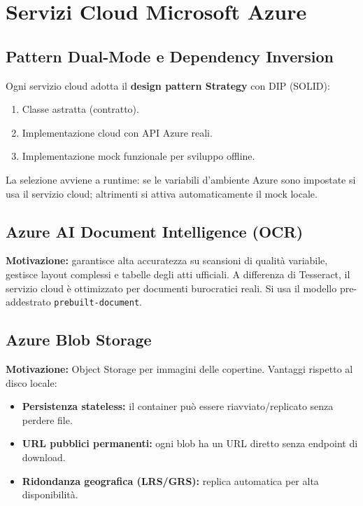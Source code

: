 \documentclass[12pt,a4paper,oneside]{report}
\begin{document}
\chapter{Servizi Cloud Microsoft Azure}

\section{Pattern Dual-Mode e Dependency Inversion}

Ogni servizio cloud adotta il \textbf{design pattern Strategy} con DIP (SOLID):
\begin{enumerate}
    \item Classe astratta (contratto).
    \item Implementazione cloud con API Azure reali.
    \item Implementazione mock funzionale per sviluppo offline.
\end{enumerate}
La selezione avviene a runtime: se le variabili d'ambiente Azure sono impostate si usa
il servizio cloud; altrimenti si attiva automaticamente il mock locale.

\section{Azure AI Document Intelligence (OCR)}

\textbf{Motivazione:} garantisce alta accuratezza su scansioni di qualit\`{a} variabile,
gestisce layout complessi e tabelle degli atti ufficiali. A differenza di Tesseract, il
servizio cloud \`{e} ottimizzato per documenti burocratici reali. Si usa il modello
pre-addestrato \texttt{prebuilt-document}.

\section{Azure Blob Storage}

\textbf{Motivazione:} Object Storage per immagini delle copertine. Vantaggi rispetto al disco locale:
\begin{itemize}
    \item \textbf{Persistenza stateless:} il container pu\`{o} essere riavviato/replicato senza perdere file.
    \item \textbf{URL pubblici permanenti:} ogni blob ha un URL diretto senza endpoint di download.
    \item \textbf{Ridondanza geografica (LRS/GRS):} replica automatica per alta disponibilit\`{a}.
\end{itemize}
\end{document}
